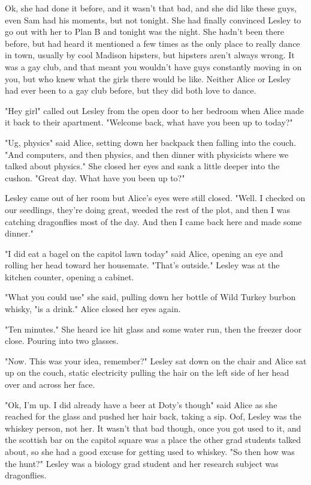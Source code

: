 Ok, she had done it before, and it wasn't that bad, and she did like these guys, even Sam had his moments, but not tonight. She had finally convinced Lesley to go out with her to Plan B and tonight was the night. She hadn't been there before, but had heard it mentioned a few times as the only place to really dance in town, usually by cool Madison hipsters, but hipsters aren't always wrong. It was a gay club, and that meant you wouldn't have guys constantly moving in on you, but who knew what the girls there would be like. Neither Alice or Lesley had ever been to a gay club before, but they did both love to dance.

\mymark

"Hey girl" called out Lesley from the open door to her bedroom when Alice made it back to their apartment. "Welcome back, what have you been up to today?"

"Ug, physics" said Alice, setting down her backpack then falling into the couch. "And computers, and then physics, and then dinner with physicists where we talked about physics." She closed her eyes and sank a little deeper into the cushon. "Great day. What have you been up to?"

Lesley came out of her room but Alice's eyes were still closed. "Well. I checked on our seedlings, they're doing great, weeded the rest of the plot, and then I was catching dragonflies most of the day. And then I came back here and made some dinner."

"I did eat a bagel on the capitol lawn today" said Alice, opening an eye and rolling her head toward her housemate. "That's outside." Lesley was at the kitchen counter, opening a cabinet. 

"What you could use" she said, pulling down her bottle of Wild Turkey burbon whisky, "is a drink." Alice closed her eyes again.

"Ten minutes." She heard ice hit glass and some water run, then the freezer door close. Pouring into two glasses.

"Now. This was your idea, remember?" Lesley sat down on the chair and Alice sat up on the couch, static electricity pulling the hair on the left side of her head over and across her face. 

"Ok, I'm up. I did already have a beer at Doty's though" said Alice as she reached for the glass and pushed her hair back, taking a sip. Oof, Lesley was the whiskey person, not her. It wasn't that bad though, once you got used to it, and the scottish bar on the capitol square was a place the other grad students talked about, so she had a good excuse for getting used to whiskey. "So then how was the hunt?" Lesley was a biology grad student and her research subject was dragonflies. 

